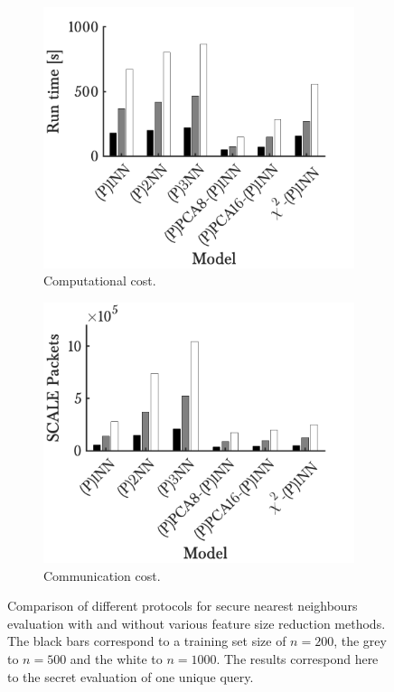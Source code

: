 \begin{figure}[h!]
\begin{subfigure}[b]{.49\textwidth}
            \centering 
            \includegraphics[width=.98\textwidth]{parts/chap-4/img-knn/knn-timing/time.png}
            \caption{Computational cost.} 
        \end{subfigure}
        \hfill
        \begin{subfigure}[b]{.49\textwidth}   
            \centering 
            \includegraphics[width=.98\textwidth]{parts/chap-4/img-knn/knn-timing/comm.png}
            \caption{Communication cost.} 
        \end{subfigure}
        \caption[Comparison of the different $k$-NN models using MPC.]{Comparison of different protocols for secure nearest neighbours evaluation with and without various feature size reduction methods. The black bars correspond to a training set size of $n=200$, the grey to $n=500$ and the white to $n=1000$. The results correspond here to the secret evaluation of one unique query.}
        \label{fig:eval-knn}
\end{figure}

\FloatBarrier